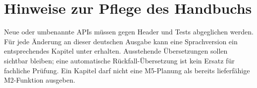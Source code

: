 \section{Hinweise zur Pflege des Handbuchs}
Neue oder umbenannte APIs müssen gegen
Header und Tests abgeglichen werden.
Für jede Änderung an dieser deutschen
Ausgabe kann eine Sprachversion ein
entsprechendes Kapitel unter
erhalten. Ausstehende Übersetzungen
sollen sichtbar bleiben; eine
automatische Rückfall-Übersetzung
ist kein Ersatz für fachliche
Prüfung. Ein Kapitel darf nicht
eine M5-Planung als bereits
lieferfähige M2-Funktion ausgeben.
